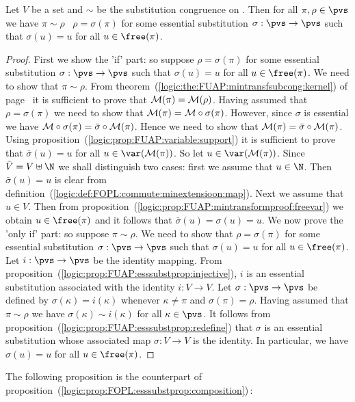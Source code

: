 \begin{prop}\label{logic:prop:FUAP:esssubstprop:subcong}
Let $V$ be a set and $\sim$ be the substitution congruence on \pvs.
Then for all $\pi,\rho\in\pvs$ we have $\pi\sim\rho$ \ifand\
$\rho=\sigma(\pi)$ for some essential substitution
$\sigma:\pvs\to\pvs$ such that $\sigma(u)=u$ for all
$u\in\free(\pi)$.
\end{prop}
\begin{proof}
First we show the 'if' part: so suppose $\rho=\sigma(\pi)$ for some
essential substitution $\sigma:\pvs\to\pvs$ such that $\sigma(u)=u$
for all $u\in\free(\pi)$. We need to show that $\pi\sim\rho$. From
theorem~(\ref{logic:the:FUAP:mintransfsubcong:kernel}) of
page~\pageref{logic:the:FUAP:mintransfsubcong:kernel} it is
sufficient to prove that ${\cal M}(\pi)={\cal M}(\rho)$. Having
assumed that $\rho=\sigma(\pi)$ we need to show that ${\cal
M}(\pi)={\cal M}\circ\sigma(\pi)$. However, since $\sigma$ is
essential we have ${\cal M}\circ\sigma(\pi)=\bar{\sigma}\circ{\cal
M}(\pi)$. Hence we need to show that ${\cal
M}(\pi)=\bar{\sigma}\circ{\cal M}(\pi)$. Using
proposition~(\ref{logic:prop:FUAP:variable:support}) it is
sufficient to prove that $\bar{\sigma}(u)=u$ for all $u\in\var({\cal
M}(\pi))$. So let $u\in\var({\cal M}(\pi))$. Since
$\bar{V}=V\uplus\N$ we shall distinguish two cases: first we assume
that $u\in\N$. Then $\bar{\sigma}(u)=u$ is clear from
definition~(\ref{logic:def:FOPL:commute:minextensioon:map}). Next we
assume that $u\in V$. Then from
proposition~(\ref{logic:prop:FUAP:mintransformproof:freevar}) we
obtain $u\in\free(\pi)$ and it follows that
$\bar{\sigma}(u)=\sigma(u)=u$. We now prove the 'only if' part: so
suppose $\pi\sim\rho$. We need to show that $\rho=\sigma(\pi)$ for
some essential substitution $\sigma:\pvs\to\pvs$ such that
$\sigma(u)=u$ for all $u\in\free(\pi)$. Let $i:\pvs\to\pvs$ be the
identity mapping. From
proposition~(\ref{logic:prop:FUAP:esssubstprop:injective}), $i$ is
an essential substitution associated with the identity $i:V\to V$.
Let $\sigma:\pvs\to\pvs$ be defined by $\sigma(\kappa)=i(\kappa)$
whenever $\kappa\neq\pi$ and $\sigma(\pi)=\rho$. Having assumed that
$\pi\sim\rho$ we have $\sigma(\kappa)\sim i(\kappa)$ for all
$\kappa\in\pvs$. It follows from
proposition~(\ref{logic:prop:FUAP:esssubstprop:redefine}) that
$\sigma$ is an essential substitution whose associated map
$\sigma:V\to V$ is the identity. In particular, we have
$\sigma(u)=u$ for all $u\in\free(\pi)$.
\end{proof}

The following proposition is the counterpart of
proposition~(\ref{logic:prop:FOPL:esssubstprop:composition})\,:

